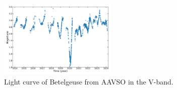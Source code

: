 \documentclass{aa}
\begin{document}
\begin{figure}[!h]
    \centering
    \includegraphics[width=0.5\textwidth]{Light_curve_Betelgeuse.png}
    \caption{Light curve of Betelgeuse from AAVSO in the V-band.}
    \label{light curve Betelgeuse}
\end{figure}


\end{document}
